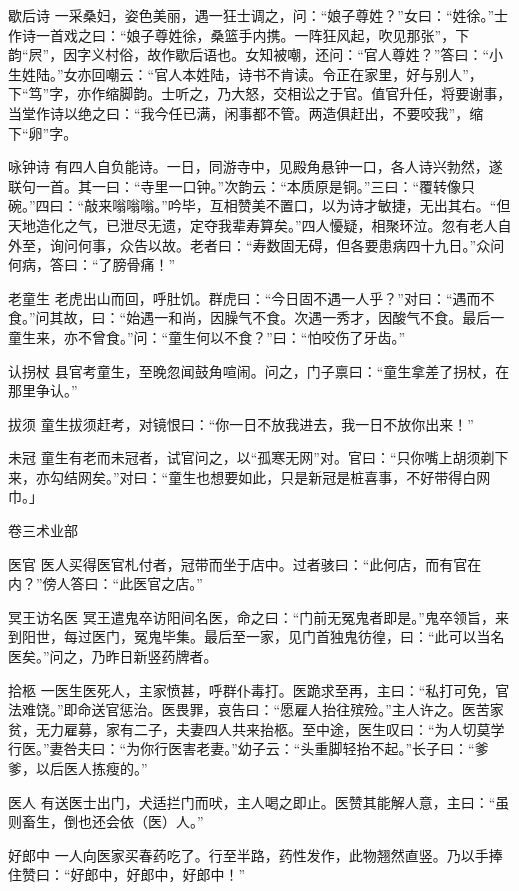 \documentclass[12pt,UTF8]{ctexbook}
\begin{document}
歇后诗
一采桑妇，姿色美丽，遇一狂士调之，问：“娘子尊姓？”女曰：“姓徐。”士作诗一首戏之曰：“娘子尊姓徐，桑篮手内携。一阵狂风起，吹见那张”，下韵“屄”，因字义村俗，故作歇后语也。女知被嘲，还问：“官人尊姓？”答曰：“小生姓陆。”女亦回嘲云：“官人本姓陆，诗书不肯读。令正在家里，好与别人”，下“笃”字，亦作缩脚韵。士听之，乃大怒，交相讼之于官。值官升任，将要谢事，当堂作诗以绝之曰：“我今任已满，闲事都不管。两造俱赶出，不要咬我”，缩下“卵”字。

咏钟诗
有四人自负能诗。一日，同游寺中，见殿角悬钟一口，各人诗兴勃然，遂联句一首。其一曰：“寺里一口钟。”次韵云：“本质原是铜。”三曰：“覆转像只碗。”四曰：“敲来嗡嗡嗡。”吟毕，互相赞美不置口，以为诗才敏捷，无出其右。“但天地造化之气，已泄尽无遗，定夺我辈寿算矣。”四人懮疑，相聚环泣。忽有老人自外至，询问何事，众告以故。老者曰：“寿数固无碍，但各要患病四十九日。”众问何病，答曰：“了膀骨痛！”

老童生
老虎出山而回，呼肚饥。群虎曰：“今日固不遇一人乎？”对曰：“遇而不食。”问其故，曰：“始遇一和尚，因臊气不食。次遇一秀才，因酸气不食。最后一童生来，亦不曾食。”问：“童生何以不食？”曰：“怕咬伤了牙齿。”

认拐杖
县官考童生，至晚忽闻鼓角喧闹。问之，门子禀曰：“童生拿差了拐杖，在那里争认。”

拔须
童生拔须赶考，对镜恨曰：“你一日不放我进去，我一日不放你出来！”

未冠
童生有老而未冠者，试官问之，以“孤寒无网”对。官曰：“只你嘴上胡须剃下来，亦勾结网矣。”对曰：“童生也想要如此，只是新冠是桩喜事，不好带得白网巾。」

卷三术业部

医官
医人买得医官札付者，冠带而坐于店中。过者骇曰：“此何店，而有官在内？”傍人答曰：“此医官之店。”

冥王访名医
冥王遣鬼卒访阳间名医，命之曰：“门前无冤鬼者即是。”鬼卒领旨，来到阳世，每过医门，冤鬼毕集。最后至一家，见门首独鬼彷徨，曰：“此可以当名医矣。”问之，乃昨日新竖药牌者。

拾柩
一医生医死人，主家愤甚，呼群仆毒打。医跪求至再，主曰：“私打可免，官法难饶。”即命送官惩治。医畏罪，哀告曰：“愿雇人抬往殡殓。”主人许之。医苦家贫，无力雇募，家有二子，夫妻四人共来抬柩。至中途，医生叹曰：“为人切莫学行医。”妻咎夫曰：“为你行医害老妻。”幼子云：“头重脚轻抬不起。”长子曰：“爹爹，以后医人拣瘦的。”

医人
有送医士出门，犬适拦门而吠，主人喝之即止。医赞其能解人意，主曰：“虽则畜生，倒也还会依（医）人。”

好郎中
一人向医家买春药吃了。行至半路，药性发作，此物翘然直竖。乃以手捧住赞曰：“好郎中，好郎中，好郎中！”
\end{document}
